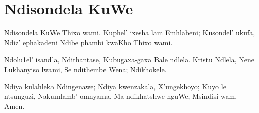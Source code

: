 \starttocol
\chapter{Ndisondela KuWe}
\nexttocol
\hfill{\it }
\stoptocol
\starttocol
\startlines
{\sc Ndisondela} KuWe
Thixo wami. 
Kuphel' ixesha lam 
Emhlabeni;
Kusondel' ukufa, 
Ndiz' ephakadeni
Ndibe phambi kwaKho
Thixo wami.

Ndolu1el' isandla,
Ndithantase,
Kubugaxa-gaxa
Bale ndlela. 
Kristu Ndlela, Nene
Lukhanyiso lwami,
Se ndithembe Wena;
Ndikhokele.
   
Ndiya kulahleka
Ndingenawe;
Ndiya kwenzakala,  
X'ungekhoyo; 
Kuyo le ntsunguzi,
Nakumlamb' omnyama, 
Ma ndikhatshwe nguWe,
Msindisi wam, Amen.
\stoplines
\nexttocol

\stoptocol
